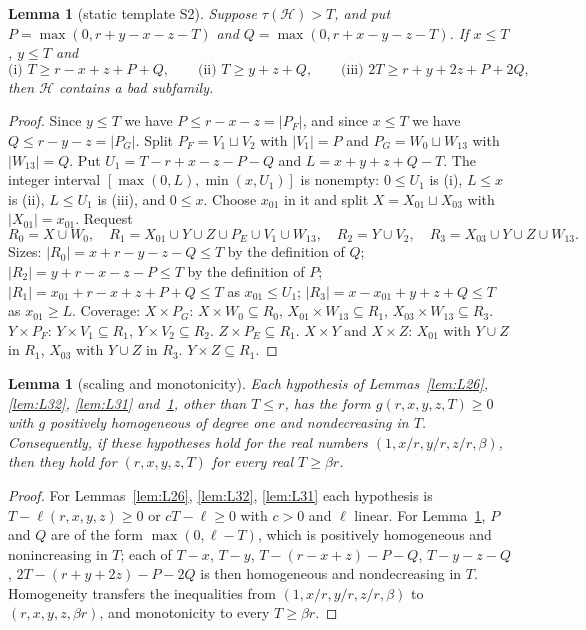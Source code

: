 \documentclass[11pt]{amsart}
\newtheorem{lemma}[theorem]{Lemma}
\theoremstyle{definition}
\theoremstyle{remark}
\newcommand{\cH}{\mathcal H}
\begin{document}
\begin{lemma}[static template S2]\label{lem:S2}
Suppose $\tau(\cH)>T$, and put $P=\max(0,r+y-x-z-T)$ and $Q=\max(0,r+x-y-z-T)$. If $x\le T$, $y\le T$ and
\[
\text{(i) } T\ge r-x+z+P+Q,\qquad \text{(ii) } T\ge y+z+Q,\qquad \text{(iii) } 2T\ge r+y+2z+P+2Q,
\]
then $\cH$ contains a bad subfamily.
\end{lemma}
\begin{proof}
Since $y\le T$ we have $P\le r-x-z=|P_F|$, and since $x\le T$ we have $Q\le r-y-z=|P_G|$. Split $P_F=V_1\sqcup V_2$ with $|V_1|=P$ and $P_G=W_0\sqcup W_{13}$ with $|W_{13}|=Q$. Put $U_1=T-r+x-z-P-Q$ and $L=x+y+z+Q-T$. The integer interval $[\max(0,L),\min(x,U_1)]$ is nonempty: $0\le U_1$ is (i), $L\le x$ is (ii), $L\le U_1$ is (iii), and $0\le x$. Choose $x_{01}$ in it and split $X=X_{01}\sqcup X_{03}$ with $|X_{01}|=x_{01}$. Request
\[
R_0=X\cup W_0,\quad R_1=X_{01}\cup Y\cup Z\cup P_E\cup V_1\cup W_{13},\quad R_2=Y\cup V_2,\quad R_3=X_{03}\cup Y\cup Z\cup W_{13}.
\]
Sizes: $|R_0|=x+r-y-z-Q\le T$ by the definition of $Q$; $|R_2|=y+r-x-z-P\le T$ by the definition of $P$; $|R_1|=x_{01}+r-x+z+P+Q\le T$ as $x_{01}\le U_1$; $|R_3|=x-x_{01}+y+z+Q\le T$ as $x_{01}\ge L$. Coverage: $X\times P_G$: $X\times W_0\subseteq R_0$, $X_{01}\times W_{13}\subseteq R_1$, $X_{03}\times W_{13}\subseteq R_3$. $Y\times P_F$: $Y\times V_1\subseteq R_1$, $Y\times V_2\subseteq R_2$. $Z\times P_E\subseteq R_1$. $X\times Y$ and $X\times Z$: $X_{01}$ with $Y\cup Z$ in $R_1$, $X_{03}$ with $Y\cup Z$ in $R_3$. $Y\times Z\subseteq R_1$.
\end{proof}

\begin{lemma}[scaling and monotonicity]\label{lem:scaling}
Each hypothesis of Lemmas~\ref{lem:L26}, \ref{lem:L32}, \ref{lem:L31} and~\ref{lem:S2}, other than $T\le r$, has the form $g(r,x,y,z,T)\ge0$ with $g$ positively homogeneous of degree one and nondecreasing in $T$. Consequently, if these hypotheses hold for the real numbers $(1,x/r,y/r,z/r,\beta)$, then they hold for $(r,x,y,z,T)$ for every real $T\ge\beta r$.
\end{lemma}
\begin{proof}
For Lemmas~\ref{lem:L26}, \ref{lem:L32}, \ref{lem:L31} each hypothesis is $T-\ell(r,x,y,z)\ge0$ or $cT-\ell\ge0$ with $c>0$ and $\ell$ linear. For Lemma~\ref{lem:S2}, $P$ and $Q$ are of the form $\max(0,\ell-T)$, which is positively homogeneous and nonincreasing in $T$; each of $T-x$, $T-y$, $T-(r-x+z)-P-Q$, $T-y-z-Q$, $2T-(r+y+2z)-P-2Q$ is then homogeneous and nondecreasing in $T$. Homogeneity transfers the inequalities from $(1,x/r,y/r,z/r,\beta)$ to $(r,x,y,z,\beta r)$, and monotonicity to every $T\ge\beta r$.
\end{proof}
\end{document}

